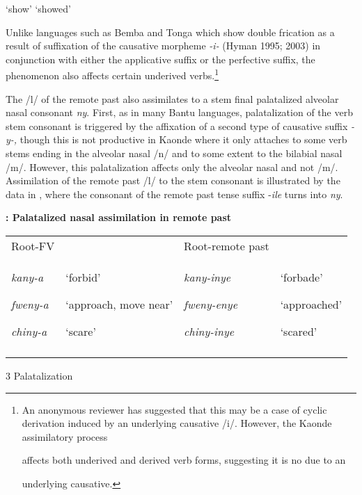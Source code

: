\documentclass[output=paper]{langsci/langscibook}
\begin{document}
\begin{stylelsTranslation}
‘show’    ‘showed’
\end{stylelsTranslation}

Unlike languages such as Bemba and Tonga which show double frication as a result of suffixation of the causative morpheme \emph{{}-i-} (Hyman 1995; 2003) in conjunction with either the applicative suffix or the perfective suffix, the phenomenon also affects certain underived verbs.\footnote{ An anonymous reviewer has suggested that this may be a case of cyclic derivation      induced by an underlying causative /i/. However, the Kaonde assimilatory process\par       affects both underived and derived verb forms, suggesting it is no due to an\par       underlying causative.\par }

\begin{styleBodyTextIndent}
The /l/ of the remote past also assimilates to a stem final palatalized alveolar nasal consonant \emph{ny}. First, as in many Bantu languages, palatalization of the verb stem consonant is triggered by the affixation of a second type of causative suffix \emph{{}-y-}\emph{\textup{,}} though this is not productive in Kaonde where it only attaches to some verb stems ending in the alveolar nasal /n/ and to some extent to the bilabial nasal /m/. However, this palatalization affects only the alveolar nasal and not /m/. Assimilation of the remote past /l/ to the stem consonant is illustrated by the data in , where the consonant of the remote past tense suffix -\emph{ile } turns into \emph{ny}.  
\end{styleBodyTextIndent}

\begin{styleBodyTextIndent}
\textbf{: Palatalized nasal assimilation in remote past}
\end{styleBodyTextIndent}

\begin{tabular}{llll}
\lsptoprule
\mdseries Root-FV &  & \mdseries Root-remote past & \\
{\mdseries \emph{kany-a }}

{\mdseries \emph{fweny-a }}

\mdseries \emph{chiny-a} & {\mdseries ‘forbid’}

{\mdseries ‘approach, move near’}

\mdseries ‘scare’ & {\mdseries \emph{kany-inye}}

{\mdseries \emph{fweny-enye}}

\mdseries \emph{chiny-inye} & {\mdseries ‘forbade’}

{\mdseries ‘approached’}

\mdseries ‘scared’\\
\lspbottomrule
\end{tabular}
\begin{stylelsSectioni}
3 Palatalization 
\end{stylelsSectioni}
\end{document}
